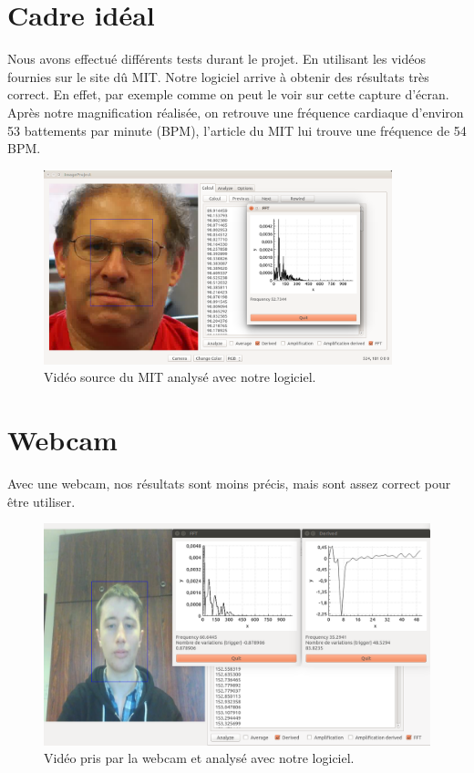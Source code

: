 \section{Cadre idéal}

Nous avons effectué différents tests durant le projet. En utilisant les vidéos fournies sur le site dû MIT. Notre logiciel arrive à obtenir des 
résultats très correct. En effet, par exemple comme on peut le voir sur cette capture d'écran. Après notre magnification réalisée, on retrouve
une fréquence cardiaque d'environ 53 battements par minute (BPM), l'article du MIT lui trouve une fréquence de 54 BPM.  

\begin{figure}[h!]
	\centering
	\includegraphics[width=0.9\textwidth]{data/cas-ideal.png}
	\caption{Vidéo source du MIT analysé avec notre logiciel.}
\end{figure}


\section{Webcam}

Avec une webcam, nos résultats sont moins précis, mais sont assez correct pour être utiliser. 

\begin{figure}[h!]
	\centering
	\includegraphics[width=1\textwidth]{data/webcam.png}
	\caption{Vidéo pris par la webcam et analysé avec notre logiciel.}
\end{figure}

